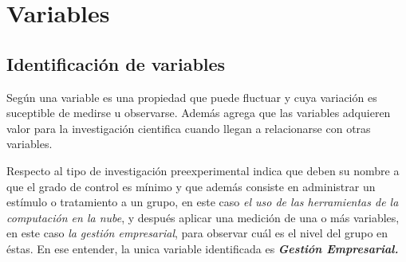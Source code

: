 \section{Variables}

\subsection{Identificación de variables}
Según \cite{sampieri} una variable es una propiedad que puede fluctuar y cuya
variación es suceptible de medirse u observarse. Además agrega que las variables
adquieren valor para la investigación cientifica cuando llegan a relacionarse
con otras variables.

Respecto al tipo de investigación preexperimental \cite{sampieri} indica que deben
su nombre a que el grado de control es mínimo y que además consiste en administrar
un estímulo o tratamiento a un grupo, en este caso \emph{el uso de las herramientas
de la computación en la nube}, y después aplicar una medición de una o más
variables, en este caso \emph{la gestión empresarial}, para observar cuál es
el nivel del grupo  en éstas. En ese entender, la unica variable identificada es
\emph{\textbf{Gestión Empresarial.}}
